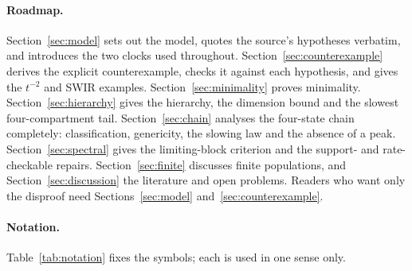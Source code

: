 \documentclass[11pt,a4paper]{article}
\theoremstyle{definition}\newtheorem{definition}[theorem]{Definition}
\theoremstyle{remark}\newtheorem{remark}[theorem]{Remark}
\begin{document}
\paragraph{Roadmap.}
Section~\ref{sec:model} sets out the model, quotes the source's
hypotheses verbatim, and introduces the two clocks used throughout.
Section~\ref{sec:counterexample} derives the explicit counterexample,
checks it against each hypothesis, and gives the $t^{-2}$ and SWIR
examples. Section~\ref{sec:minimality} proves minimality.
Section~\ref{sec:hierarchy} gives the hierarchy, the dimension bound and
the slowest four-compartment tail.
Section~\ref{sec:chain} analyses the four-state chain completely:
classification, genericity, the slowing law and the absence of a peak.
Section~\ref{sec:spectral} gives the limiting-block criterion and the
support- and rate-checkable repairs. Section~\ref{sec:finite} discusses
finite populations, and Section~\ref{sec:discussion} the literature and
open problems. Readers who want only the disproof need
Sections~\ref{sec:model} and~\ref{sec:counterexample}.

\paragraph{Notation.} Table~\ref{tab:notation} fixes the symbols; each
is used in one sense only.
\end{document}
